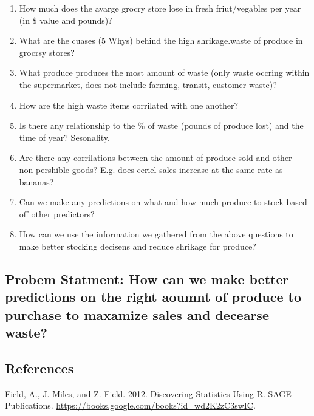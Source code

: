 \documentclass[]{article}
\providecommand{\tightlist}{%
  \setlength{\itemsep}{0pt}\setlength{\parskip}{0pt}}
\begin{document}
\begin{enumerate}
\def\labelenumi{\arabic{enumi}.}
\tightlist
\item
  How much does the avarge grocry store lose in fresh friut/vegables per
  year (in \$ value and pounds)?
\item
  What are the cuases (5 Whys) behind the high shrikage.waste of produce
  in grocrsy stores?
\item
  What produce produces the most amount of waste (only waste occring
  within the supermarket, does not include farming, transit, customer
  waste)?
\item
  How are the high waste items corrilated with one another?
\item
  Is there any relationship to the \% of waste (pounds of produce lost)
  and the time of year? Sesonality.
\item
  Are there any corrilations between the amount of produce sold and
  other non-pershible goods? E.g. does ceriel sales increase at the same
  rate as bananas?
\item
  Can we make any predictions on what and how much produce to stock
  based off other predictors?
\item
  How can we use the information we gathered from the above questions to
  make better stocking decisens and reduce shrikage for produce?
\end{enumerate}

\subsection{Probem Statment: How can we make better predictions on the
right aoumnt of produce to purchase to maxamize sales and decearse
waste?}\label{probem-statment-how-can-we-make-better-predictions-on-the-right-aoumnt-of-produce-to-purchase-to-maxamize-sales-and-decearse-waste}

\subsection{References}\label{references}

Field, A., J. Miles, and Z. Field. 2012. Discovering Statistics Using R.
SAGE Publications. \url{https://books.google.com/books?id=wd2K2zC3swIC}.
\end{document}
